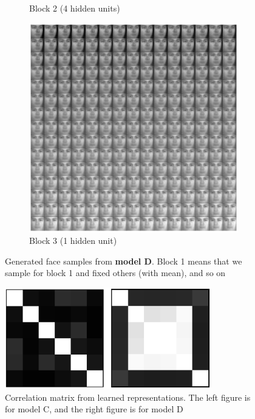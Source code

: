 \begin{figure}
\begin{subfigure}[b]{0.5\textwidth}
    \vspace{-2\baselineskip}
    \caption{Block 2 (4 hidden units)}
    \end{subfigure}
    \begin{subfigure}[b]{0.5\textwidth}
    \includegraphics[width=\textwidth]{images/faceBlock3.eps}
    \vspace{-2\baselineskip}
    \caption{Block 3 (1 hidden unit)}
    \end{subfigure}
    \caption{Generated face samples from \textbf{model D}. Block 1 means that we sample for block 1 and fixed others (with mean), and so on}\label{fig:animals}
    \label{fig:Facesamples}
\end{figure}


\begin{figure}
\centering
    \includegraphics[width=0.8\textwidth]{images/faceCorrCompare.eps}
    \caption{Correlation matrix from learned representations. The left figure is for model C, and the right figure is for model D}
    \label{fig:FacesamplesModel3}
\end{figure}






